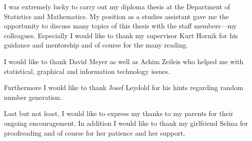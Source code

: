 \begin{acknowledgments}
I was extremely lucky to carry out my diploma thesis at the Department
of Statistics and Mathematics. My position as a studies assistant gave
me the opportunity to discuss many topics of this thesis with
the staff members---my colleagues. Especially I would like to thank my
supervisor Kurt Hornik for his guidance and mentorship and of course for
the many reading.

I would like to thank David Meyer as well as
Achim Zeileis who helped me with statistical, graphical and
information technology issues.

Furthermore I would like to thank Josef Leydold for his hints
regarding random number generation.

Last but not least, I would like to express my thanks to my parents
for their ongoing encouragement. In addition I would
like to thank my girlfriend Selma for proofreading and 
of course for her patience and her support.

\end{acknowledgments}